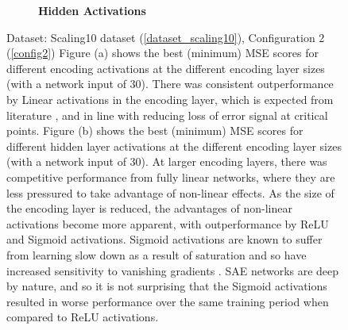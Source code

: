 \documentclass[a4paper,11pt,oneside]{article}
\theoremstyle{plain}
\theoremstyle{definition}
\begin{document}
\begin{figure}[H]
\begin{subfigure}{.99\textwidth}
			\caption[MSE by Activations and Encoding Layer Size - Hidden Activations]{\textbf{Hidden Activations} 
				\newline }
			\label{figure-actual_mse_hidden_activations}
		\end{subfigure}
		\caption[MSE by Activations and Encoding Layer Size]
		{Dataset: Scaling10 dataset (\ref{dataset_scaling10}), Configuration 2 (\ref{config2})
			\newline Figure (a) shows the best (minimum) MSE scores for different encoding activations at the different encoding layer sizes (with a network input of 30). There was consistent outperformance by Linear activations in the encoding layer, which is expected from literature \citep{Hinton2}, and in line with reducing loss of error signal at critical points. 
			\newline Figure (b) shows the best (minimum) MSE scores for different hidden layer activations at the different encoding layer sizes (with a network input of 30). At larger encoding layers, there was competitive performance from fully linear networks, where they are less pressured to take advantage of non-linear effects. As the size of the encoding layer is reduced, the advantages of non-linear activations become more apparent, with outperformance by ReLU and Sigmoid activations. Sigmoid activations are known to suffer from learning slow down as a result of saturation and so have increased sensitivity to vanishing gradients \citep{Glorot2}. SAE networks are deep by nature, and so it is not surprising that the Sigmoid activations resulted in worse performance over the same training period when compared to ReLU activations. \newline}
		\label{figure-mse_encoding_activations}
	\end{figure}
	
\end{document}
